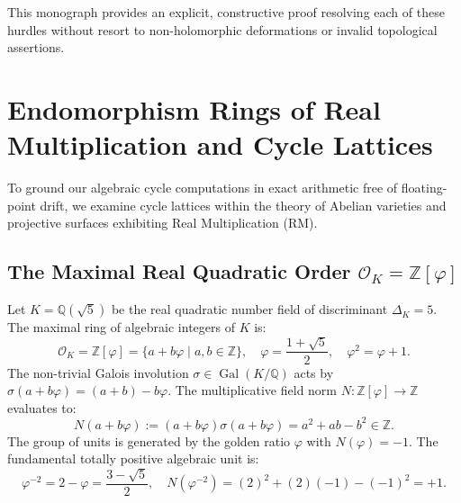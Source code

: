 \documentclass[11pt,reqno]{article}
\theoremstyle{definition}
\DeclareMathOperator{\Gal}{Gal}
\begin{document}
This monograph provides an explicit, constructive proof resolving each of these hurdles without resort to non-holomorphic deformations or invalid topological assertions.

\section{Endomorphism Rings of Real Multiplication and Cycle Lattices}

To ground our algebraic cycle computations in exact arithmetic free of floating-point drift, we examine cycle lattices within the theory of Abelian varieties and projective surfaces exhibiting Real Multiplication (RM).

\subsection{The Maximal Real Quadratic Order $\mathcal{O}_K = \mathbb{Z}[\varphi]$}
Let $K = \mathbb{Q}(\sqrt{5})$ be the real quadratic number field of discriminant $\Delta_K = 5$. The maximal ring of algebraic integers of $K$ is:
\begin{equation}
\mathcal{O}_K = \mathbb{Z}[\varphi] = \{a + b\varphi \mid a, b \in \mathbb{Z}\}, \quad \varphi = \frac{1 + \sqrt{5}}{2}, \quad \varphi^2 = \varphi + 1.
\end{equation}
The non-trivial Galois involution $\sigma \in \Gal(K/\mathbb{Q})$ acts by $\sigma(a + b\varphi) = (a + b) - b\varphi$. The multiplicative field norm $N : \mathbb{Z}[\varphi] \to \mathbb{Z}$ evaluates to:
\begin{equation}
N(a + b\varphi) := (a + b\varphi)\sigma(a + b\varphi) = a^2 + ab - b^2 \in \mathbb{Z}.
\end{equation}
The group of units is generated by the golden ratio $\varphi$ with $N(\varphi) = -1$. The fundamental totally positive algebraic unit is:
\begin{equation}
\varphi^{-2} = 2 - \varphi = \frac{3 - \sqrt{5}}{2}, \quad N(\varphi^{-2}) = (2)^2 + (2)(-1) - (-1)^2 = +1.
\end{equation}
\end{document}
